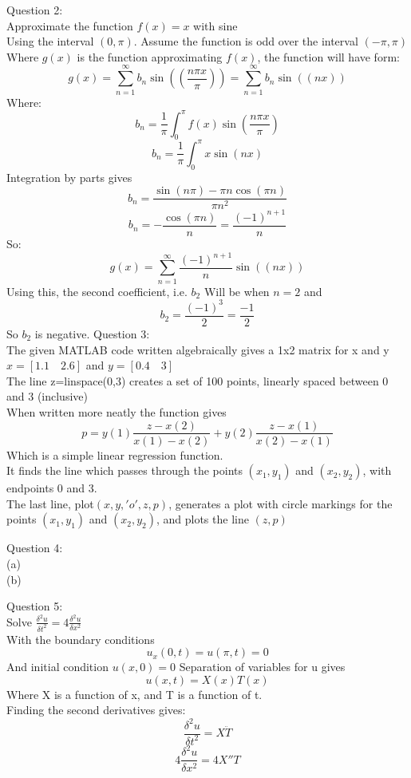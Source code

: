 \documentclass[a4paper]{article}
\begin{document}
	\newpage
	Question 2:\\
	Approximate the function $f(x)=x$ with sine
	\\Using the interval $(0,\pi)$. Assume the function is odd over the interval $(-\pi,\pi)$\\
	Where $g(x)$ is the function approximating $f(x)$, the function will have form:
	$$g(x)=\sum_{n=1}^{\infty}b_n\sin(\left(\frac{n\pi x}{\pi}\right))=\sum_{n=1}^{\infty}b_n\sin(\left(n x\right))$$
	Where:
	$$b_n=\frac{1}{\pi}\int_{0}^{\pi}f(x)\sin{\left(\frac{n\pi x}{\pi}\right)}$$
	$$b_n=\frac{1}{\pi}\int_{0}^{\pi}x\sin{\left(nx\right)}$$
	Integration by parts gives
	$$b_n=\frac{\sin{\left(n\pi\right)}-\pi n \cos\left(\pi n\right)}{\pi n^2}$$
	$$b_n=-\frac{\cos\left(\pi n\right)}{n}=\frac{(-1)^{n+1}}{n}$$
	So:
	$$g(x)=\sum_{n=1}^{\infty}\frac{(-1)^{n+1}}{n}\sin(\left(n x\right))$$
	Using this, the second coefficient, i.e. $b_2$
	Will be when $n=2$ and 
	$$b_2=\frac{(-1)^{3}}{2}=\frac{-1}{2}$$
	So $b_2$ is negative.
	\newpage
	Question 3:\\
	The given MATLAB code written algebraically gives a 
	1x2 matrix for x and y
	$x=\left[1.1\quad2.6\right]$ and $y=\left[0.4\quad   3\right]$\\
	The line z=linspace(0,3) creates a set of 100 points, linearly spaced between 0 and 3 (inclusive)\\
	When written more neatly the function gives
	$$p=y(1)\frac{z-x(2)}{x(1)-x(2)}+y(2)\frac{z-x(1)}{x(2)-x(1)}$$
	Which is a simple linear regression function.\\
	It finds the line which passes through the points $(x_1, y_1)$ and $(x_2,y_2)$, with endpoints 0 and 3.\\
	The last line, plot$(x,y,'o',z,p)$, generates a plot with circle markings for the points $(x_1, y_1)$ and $(x_2,y_2)$, and plots the line $(z,p)$
	
	
	\newpage
	Question 4:\\
	(a)
	\\
	(b)
	
	\newpage
	Question 5:\\
	Solve $\frac{\delta^2u}{\delta t^2}=4 \frac{\delta^2u}{\delta x^2}$\\
	With the boundary conditions
	$$u_x(0,t)=u(\pi,t)=0$$
	And initial condition $u(x,0)=0$
	Separation of variables for u gives
	$$u(x,t)=X(x)T(x)$$
	Where X is a function of x, and T is a function of t.\\
	Finding the second derivatives gives:
	$$\frac{\delta^2u}{\delta t^2}=X\ddot{T}$$
	$$4 \frac{\delta^2u}{\delta x^2}=4X''T$$
	
\end{document}
